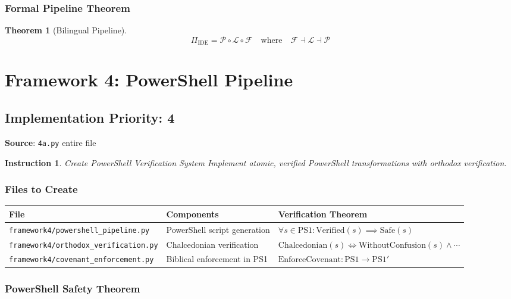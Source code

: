 \documentclass[12pt]{article}
\newtheorem{instruction}{Instruction}
\newtheorem{theorem}{Theorem}
\begin{document}
\subsubsection{Formal Pipeline Theorem}

\begin{theorem}[Bilingual Pipeline]
\[
\Pi_{\text{IDE}} = \mathcal{P} \circ \mathcal{L} \circ \mathcal{F} \quad \text{where} \quad \mathcal{F} \dashv \mathcal{L} \dashv \mathcal{P}
\]
\end{theorem}

\section{Framework 4: PowerShell Pipeline}

\subsection{Implementation Priority: 4}
\textbf{Source}: \texttt{4a.py} entire file

\begin{instruction}{Create PowerShell Verification System}
Implement atomic, verified PowerShell transformations with orthodox verification.
\end{instruction}

\subsubsection{Files to Create}

\begin{longtable}{|p{}|p{}|p{}|}
\hline
\textbf{File} & \textbf{Components} & \textbf{Verification Theorem} \\
\hline
\texttt{framework4/powershell\_pipeline.py} & PowerShell script generation & $\forall s \in \text{PS1}: \text{Verified}(s) \implies \text{Safe}(s)$ \\
\hline
\texttt{framework4/orthodox\_verification.py} & Chalcedonian verification & $\text{Chalcedonian}(s) \iff \text{WithoutConfusion}(s) \land \cdots$ \\
\hline
\texttt{framework4/covenant\_enforcement.py} & Biblical enforcement in PS1 & $\text{EnforceCovenant}: \text{PS1} \to \text{PS1}'$ \\
\hline
\end{longtable}

\subsubsection{PowerShell Safety Theorem}
\end{document}
